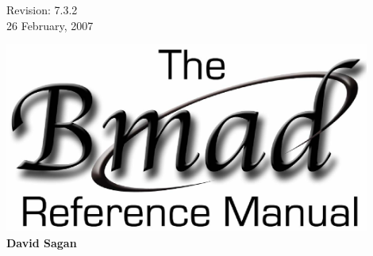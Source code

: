 \thispagestyle{empty}

\begin{flushright}
\large
  Revision: 7.3.2 \\
  26 February, 2007 \\
\end{flushright}

\vfill

{
\begin{center}
\includegraphics[width=12cm]{bmad-ref-manual.eps} \\
\vskip 0.3in
\huge\bf David Sagan
\end{center}
}

\vfill
\break
